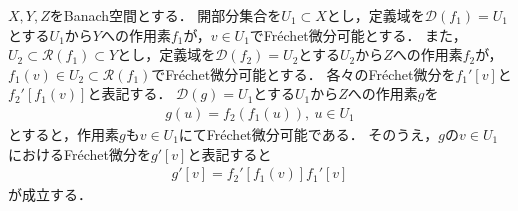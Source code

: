 \begin{Thm}[Fr\'echet微分の連鎖律]\label{thm:frechet_chain}
$X, Y, Z$をBanach空間とする．
開部分集合を$U_1 \subset X$とし，定義域を${\mathcal D}(f_1) = U_1$とする$U_1$から$Y$への作用素$f_1$が，$v \in U_1$でFr\'echet微分可能とする．
また，$U_2 \subset {\mathcal R}(f_1) \subset Y$とし，定義域を${\mathcal D}(f_2) = U_2$とする$U_2$から$Z$への作用素$f_2$が，$f_1(v) \in U_2 \subset {\mathcal R}(f_1)$でFr\'echet微分可能とする．
各々のFr\'echet微分を$f_1'[v]$と$f_2'[f_1(v)]$と表記する．
${\mathcal D}(g)  = U_1$とする$U_1$から$Z$への作用素$g$を
\begin{align*}
g(u) = f_2( f_1(u) ), ~ u \in U_1
\end{align*}
とすると，作用素$g$も$v \in U_1$にてFr\'echet微分可能である．
そのうえ，$g$の$v \in U_1$におけるFr\'echet微分を$g'[v]$と表記すると
\begin{align*}
g'[v] = f_2'[ f_1( v ) ] f_1'[ v ]
\end{align*}
が成立する．
\end{Thm}

